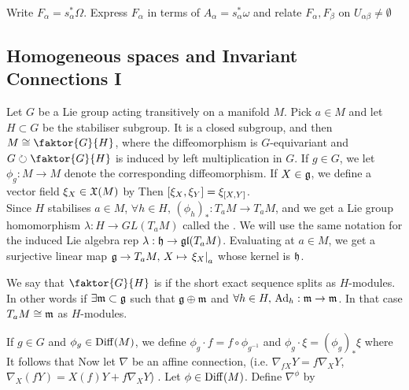 \documentclass{article}
\begin{document}
\begin{ex}
	Write $F_\alpha = s_\alpha^\ast \Omega$. Express $F_\alpha$ in terms of $A_\alpha = s_\alpha^\ast \omega$ and relate $F_\alpha, F_\beta$ on $U_{\alpha\beta} \neq \emptyset $
\end{ex}

\subsection{Homogeneous spaces and Invariant Connections I}
Let $G$ be a Lie group acting transitively on a manifold $M$. Pick $a \in M$ and let $H \subset G$ be the stabiliser subgroup. It is a closed subgroup, and then $M \cong \faktor{G}{H}$, where the diffeomorphism is $G$-equivariant and $G \lact \faktor{G}{H}$ is induced by left multiplication in $G$. If $g \in G$, we let $\phi_g : M \to M$ denote the corresponding diffeomorphism. If $X \in \mf{g}$, we define a vector field $\xi_X \in \mf{X}(M)$ by 
Then $\comm[\xi_X]{\xi_Y} = \xi_{\comm[X]{Y}}$. \\
Since $H$ stabilises $a \in M$, $\forall h \in H, \, (\phi_h)_\ast : T_aM \to T_a M$, and we get a Lie group homomorphism $\lambda : H \to GL(T_aM)$ called the . We will use the same notation for the induced Lie algebra rep $\lambda: \mf{h} \to \mf{gl}(T_aM)$. Evaluating at $a \in M$, we get a surjective linear map $\mf{g} \to T_aM, \, X \mapsto \ev{\xi_X}{a}$ whose kernel is $\mf{h}$. 

\begin{definition}
	We say that $\faktor{G}{H}$ is  if the short exact sequence 
	splits as $H$-modules. In other words if $\exists \mf{m} \subset \mf{g}$ such that $\mf{g} \oplus \mf{m}$ and $\forall h \in H, \, \Ad_h : \mf{m} \to \mf{m} $. In that case $T_aM \cong \mf{m}$ as $H$-modules. 
\end{definition}

If $g \in G$ and $\phi_g \in \Diff(M)$, we define $\phi_g \cdot f = f \circ \phi_{g^{-1}}$ and $\phi_g \cdot \xi = (\phi_g)_\ast \xi$ where 
It follows that 
Now let $\nabla $ be an affine connection, (i.e. $\nabla_{fX}Y = f \nabla_XY$, $\nabla_X(fY) = X(f)Y + f\nabla_X Y$) . Let $\phi \in \Diff(M)$. Define $\nabla^\phi$ by 
\end{document}
